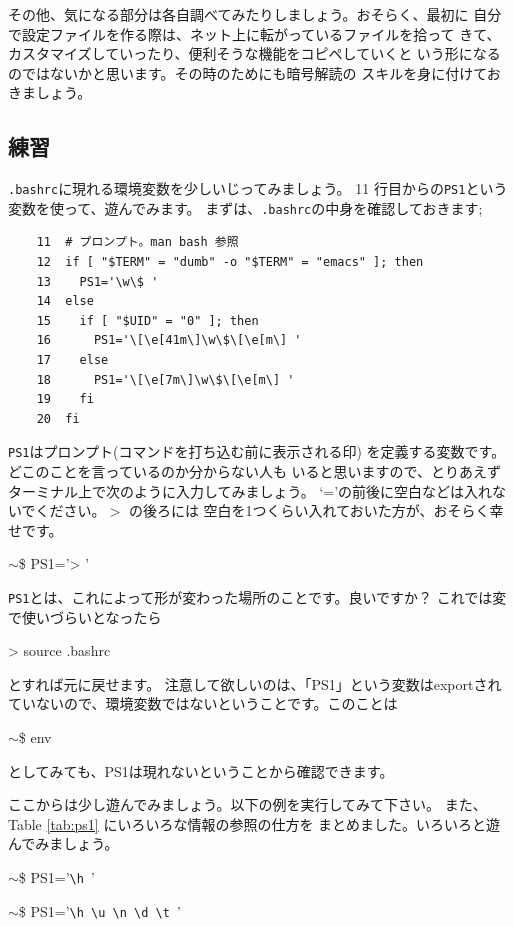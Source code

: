 \documentclass[a4j]{ltjsreport}
\begin{document}
    その他、気になる部分は各自調べてみたりしましょう。おそらく、最初に
    自分で設定ファイルを作る際は、ネット上に転がっているファイルを拾って
    きて、カスタマイズしていったり、便利そうな機能をコピペしていくと
    いう形になるのではないかと思います。その時のためにも暗号解読の
    スキルを身に付けておきましょう。

    \subsection{練習}
    \verb+.bashrc+に現れる環境変数を少しいじってみましょう。
    11 行目からの\verb+PS1+という変数を使って、遊んでみます。
    まずは、\verb+.bashrc+の中身を確認しておきます;
    \begin{verbatim}
    11  # プロンプト。man bash 参照
    12  if [ "$TERM" = "dumb" -o "$TERM" = "emacs" ]; then
    13    PS1='\w\$ '
    14  else
    15    if [ "$UID" = "0" ]; then
    16      PS1='\[\e[41m\]\w\$\[\e[m\] '
    17    else
    18      PS1='\[\e[7m\]\w\$\[\e[m\] '
    19    fi
    20  fi
    \end{verbatim}
    \verb+PS1+はプロンプト(コマンドを打ち込む前に表示される印)
    を定義する変数です。どこのことを言っているのか分からない人も
    いると思いますので、とりあえずターミナル上で次のように入力してみましょう。
    `='の前後に空白などは入れないでください。$>$ の後ろには
    空白を1つくらい入れておいた方が、おそらく幸せです。
    \begin{screen}
        $\sim$\$ PS1='> '
    \end{screen}
    \verb+PS1+とは、これによって形が変わった場所のことです。良いですか？
    これでは変で使いづらいとなったら
    \begin{screen}
        > source .bashrc
    \end{screen}
    とすれば元に戻せます。
    注意して欲しいのは、「PS1」という変数はexportされていないので、環境変数ではないということです。このことは
    \begin{screen}
        $\sim$\$ env
    \end{screen}
    としてみても、PS1は現れないということから確認できます。

    ここからは少し遊んでみましょう。以下の例を実行してみて下さい。
    また、Table \ref{tab:ps1} にいろいろな情報の参照の仕方を
    まとめました。いろいろと遊んでみましょう。
    \begin{screen}
        $\sim$\$ PS1='\verb+\h +' 
    \end{screen}

    \begin{screen}
        $\sim$\$ PS1='\verb+\h \u \n \d \t +'
    \end{screen}
\end{document}
